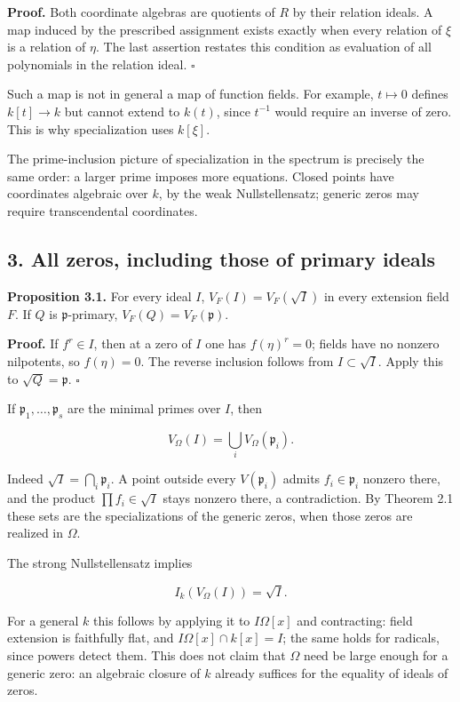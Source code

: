 \documentclass[
]{article}
\begin{document}
\textbf{Proof.} Both coordinate algebras are quotients of \(R\) by their
relation ideals. A map induced by the prescribed assignment exists
exactly when every relation of \(\xi\) is a relation of \(\eta\). The
last assertion restates this condition as evaluation of all polynomials
in the relation ideal. \(\square\)

Such a map is not in general a map of function fields. For example,
\(t\mapsto0\) defines \(k[t]\to k\) but cannot extend to \(k(t)\), since
\(t^{-1}\) would require an inverse of zero. This is why specialization
uses \(k[\xi]\).

The prime-inclusion picture of specialization in the spectrum is
precisely the same order: a larger prime imposes more equations. Closed
points have coordinates algebraic over \(k\), by the weak
Nullstellensatz; generic zeros may require transcendental coordinates.

\subsection{3. All zeros, including those of primary
ideals}\label{all-zeros-including-those-of-primary-ideals}

\textbf{Proposition 3.1.} For every ideal \(I\), \(V_F(I)=V_F(\sqrt I)\)
in every extension field \(F\). If \(Q\) is \(\mathfrak p\)-primary,
\(V_F(Q)=V_F(\mathfrak p)\).

\textbf{Proof.} If \(f^r\in I\), then at a zero of \(I\) one has
\(f(\eta)^r=0\); fields have no nonzero nilpotents, so \(f(\eta)=0\).
The reverse inclusion follows from \(I\subset\sqrt I\). Apply this to
\(\sqrt Q=\mathfrak p\). \(\square\)

If \(\mathfrak p_1,\ldots,\mathfrak p_s\) are the minimal primes over
\(I\), then

\[
V_\Omega(I)=\bigcup_i V_\Omega(\mathfrak p_i).
\]

Indeed \(\sqrt I=\bigcap_i\mathfrak p_i\). A point outside every
\(V(\mathfrak p_i)\) admits \(f_i\in\mathfrak p_i\) nonzero there, and
the product \(\prod f_i\in\sqrt I\) stays nonzero there, a
contradiction. By Theorem 2.1 these sets are the specializations of the
generic zeros, when those zeros are realized in \(\Omega\).

The strong Nullstellensatz implies

\[
I_k(V_\Omega(I))=\sqrt I.
\]

For a general \(k\) this follows by applying it to \(I\Omega[x]\) and
contracting: field extension is faithfully flat, and
\(I\Omega[x]\cap k[x]=I\); the same holds for radicals, since powers
detect them. This does not claim that \(\Omega\) need be large enough
for a generic zero: an algebraic closure of \(k\) already suffices for
the equality of ideals of zeros.
\end{document}
